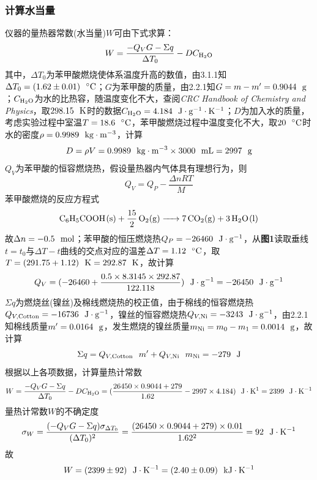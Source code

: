 \documentclass[12pt]{article}
\begin{document}
 \subsubsection{计算水当量}
仪器的量热器常数(水当量)$W$可由下式求算：
$$
W=\frac{-Q_{V}G-\Sigma q}{\Delta T_{0}}-DC_{\rm H_{2}O}
$$
其中，$\Delta T_{0}$为苯甲酸燃烧使体系温度升高的数值，由3.1.1知$\Delta T_{0}=(1.62\pm 0.01)\ \ {\rm ^{\circ}C}$；$G$为苯甲酸的质量，由2.2.1知$G=m-m^{\prime}=0.9044\ \ {\rm g}$；$C_{\rm H_{2}O}$为水的比热容，随温度变化不大，查阅\textit{CRC Handbook of Chemistry and Physics}\citealp{crc}，取$298.15\ \ {\rm K}$时的数据$C_{\rm H_{2}O}=4.184\ \ {\rm J\cdot g^{-1}\cdot K^{-1}}$；$D$为加入水的质量，考虑实验过程中室温$T=18.6\ \ {\rm ^{\circ}C}$，苯甲酸燃烧过程中温度变化不大，取$20\ \ {\rm ^{\circ}C}$时水的密度$\rho=0.9989\ \ {\rm kg\cdot m^{-3}}$，计算
$$
D=\rho V=0.9989\ \ {\rm kg\cdot m^{-3}} \times 3000\ \ {\rm mL}=2997\ \ {\rm g}
$$
$Q_{V}$为苯甲酸的恒容燃烧热，假设量热器内气体具有理想行为，则
$$
Q_{V}=Q_{P}-\frac{\Delta n RT}{M}
$$
苯甲酸燃烧的反应方程式
$$
\ce{C6H5COOH(s) +  15/2 O2(g) -> 7 CO2(g) + 3 H2O(l)}
$$
故$\Delta n=-0.5\ \ {\rm mol}$；苯甲酸的恒压燃烧热$Q_{P}=-26460\ \ {\rm J\cdot g^{-1}}$，从\textbf{图1}读取垂线$t=t_{0}$与$\Delta T-t$曲线的交点对应的温差$\Delta T=1.12\ \ {\rm ^{\circ}C}$，取$T=(291.75+1.12)\ \ {\rm K}=292.87\ \ {\rm K}$，故计算
$$
Q_{V}=(-26460+\frac{0.5\times 8.3145 \times 292.87}{122.118})\ \ {\rm J\cdot g^{-1}}=-26450\ \ {\rm J\cdot g^{-1}}
$$
$\Sigma q$为燃烧丝(镍丝)及棉线燃烧热的校正值，由于棉线的恒容燃烧热$Q_{V, {\rm Cotton}}=-16736\ \ {\rm J\cdot g^{-1}}$，镍丝的恒容燃烧热$Q_{V, {\rm Ni}}=-3243\ \ {\rm J\cdot g^{-1}}$，由2.2.1知棉线质量$m^{\prime}=0.0164\ \ {\rm g}$，发生燃烧的镍丝质量$m_{\rm Ni}=m_{0}-m_{1}=0.0014\ \ {\rm g}$，故计算
$$
\Sigma q=Q_{V, {\rm Cotton}} \ \ m^{\prime}+Q_{V, {\rm Ni}} \ \ m_{\rm Ni}=-279\ \ {\rm J}
$$
根据以上各项数据，计算量热计常数
$$
W=\frac{-Q_{V}G-\Sigma q}{\Delta T_{0}}-DC_{\rm H_{2}O}=(\frac{26450\times 0.9044+279}{1.62}-2997\times 4.184)\ \ {\rm J\cdot K^{\-1}}=2399\ \ {\rm J\cdot K^{-1}}
$$
量热计常数$W$的不确定度
$$
\sigma_{W}=\frac{(-Q_{V}G-\Sigma q)\sigma_{\Delta T_{0}}}{(\Delta T_{0})^{2}}=\frac{(26450\times 0.9044+279)\times 0.01}{1.62^{2}}=92\ \ {\rm J\cdot K^{-1}}
$$
故
$$
W=(2399\pm 92)\ \ {\rm J\cdot K^{-1}}=(2.40\pm 0.09)\ \ {\rm kJ\cdot K^{-1}}
$$
\end{document}
